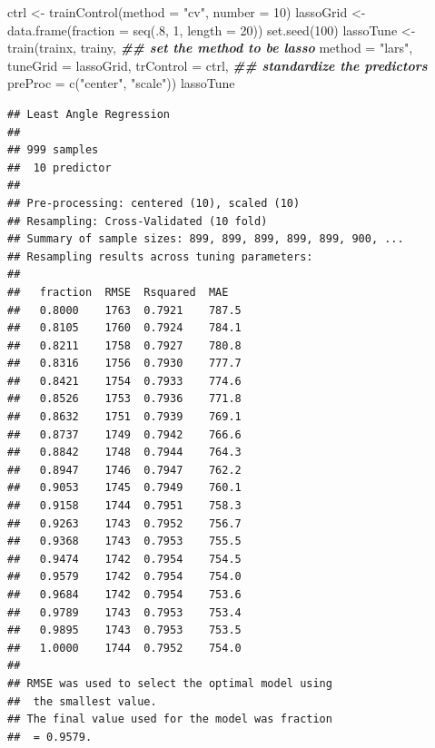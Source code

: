 \documentclass[
  12pt,
]{krantz}
\makeatletter
\newenvironment{Shaded}{\begin{snugshade}}{\end{snugshade}}
\newcommand{\AttributeTok}[1]{\textcolor[rgb]{0.61,0.61,0.61}{#1}}
\newcommand{\DecValTok}[1]{\textcolor[rgb]{0.06,0.06,0.06}{#1}}
\newcommand{\DocumentationTok}[1]{\textcolor[rgb]{0.37,0.37,0.37}{\textbf{\textit{#1}}}}
\newcommand{\FunctionTok}[1]{\textcolor[rgb]{0,0,0}{#1}}
\newcommand{\NormalTok}[1]{#1}
\newcommand{\OtherTok}[1]{\textcolor[rgb]{0.37,0.37,0.37}{#1}}
\newcommand{\StringTok}[1]{\textcolor[rgb]{0.5,0.5,0.5}{#1}}
\newenvironment{kframe}{%
\medskip{}
\setlength{\fboxsep}{.8em}
 \def\at@end@of@kframe{}%
 \ifinner\ifhmode%
  \def\at@end@of@kframe{\end{minipage}}%
  \begin{minipage}{\columnwidth}%
 \fi\fi%
 \def\FrameCommand##1{\hskip\@totalleftmargin \hskip-\fboxsep
 \colorbox{shadecolor}{##1}\hskip-\fboxsep
     \hskip-\linewidth \hskip-\@totalleftmargin \hskip\columnwidth}%
 \MakeFramed {\advance\hsize-\width
   \@totalleftmargin\z@ \linewidth\hsize
   \@setminipage}}%
 {\par\unskip\endMakeFramed%
 \at@end@of@kframe}
\renewenvironment{Shaded}{\begin{kframe}}{\end{kframe}}
\makeatother
\begin{document}
\begin{Shaded}
\begin{Highlighting}[]
\NormalTok{ctrl }\OtherTok{\textless{}{-}} \FunctionTok{trainControl}\NormalTok{(}\AttributeTok{method =} \StringTok{"cv"}\NormalTok{, }\AttributeTok{number =} \DecValTok{10}\NormalTok{)}
\NormalTok{lassoGrid }\OtherTok{\textless{}{-}} \FunctionTok{data.frame}\NormalTok{(}\AttributeTok{fraction =} \FunctionTok{seq}\NormalTok{(.}\DecValTok{8}\NormalTok{, }\DecValTok{1}\NormalTok{, }\AttributeTok{length =} \DecValTok{20}\NormalTok{))}
\FunctionTok{set.seed}\NormalTok{(}\DecValTok{100}\NormalTok{)}
\NormalTok{lassoTune }\OtherTok{\textless{}{-}} \FunctionTok{train}\NormalTok{(trainx, trainy,}
                      \DocumentationTok{\#\# set the method to be lasso}
                      \AttributeTok{method =} \StringTok{"lars"}\NormalTok{,}
                      \AttributeTok{tuneGrid =}\NormalTok{ lassoGrid,}
                      \AttributeTok{trControl =}\NormalTok{ ctrl,}
                      \DocumentationTok{\#\# standardize the predictors}
                      \AttributeTok{preProc =} \FunctionTok{c}\NormalTok{(}\StringTok{"center"}\NormalTok{, }\StringTok{"scale"}\NormalTok{))}
\NormalTok{lassoTune}
\end{Highlighting}
\end{Shaded}

\begin{verbatim}
## Least Angle Regression 
## 
## 999 samples
##  10 predictor
## 
## Pre-processing: centered (10), scaled (10) 
## Resampling: Cross-Validated (10 fold) 
## Summary of sample sizes: 899, 899, 899, 899, 899, 900, ... 
## Resampling results across tuning parameters:
## 
##   fraction  RMSE  Rsquared  MAE  
##   0.8000    1763  0.7921    787.5
##   0.8105    1760  0.7924    784.1
##   0.8211    1758  0.7927    780.8
##   0.8316    1756  0.7930    777.7
##   0.8421    1754  0.7933    774.6
##   0.8526    1753  0.7936    771.8
##   0.8632    1751  0.7939    769.1
##   0.8737    1749  0.7942    766.6
##   0.8842    1748  0.7944    764.3
##   0.8947    1746  0.7947    762.2
##   0.9053    1745  0.7949    760.1
##   0.9158    1744  0.7951    758.3
##   0.9263    1743  0.7952    756.7
##   0.9368    1743  0.7953    755.5
##   0.9474    1742  0.7954    754.5
##   0.9579    1742  0.7954    754.0
##   0.9684    1742  0.7954    753.6
##   0.9789    1743  0.7953    753.4
##   0.9895    1743  0.7953    753.5
##   1.0000    1744  0.7952    754.0
## 
## RMSE was used to select the optimal model using
##  the smallest value.
## The final value used for the model was fraction
##  = 0.9579.
\end{verbatim}
\end{document}

